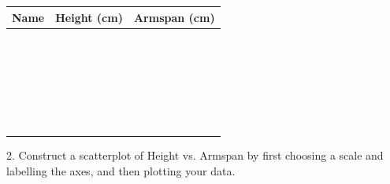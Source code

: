 \documentclass{article}
\begin{document}
\begin{center}
{\large
\begin{tabular}{c|c|c}
\textbf{Name} & \textbf{Height (cm)} & \textbf{Armspan (cm)} \\ \hline
 \hspace{4cm} & & \\ \hline
 & & \\ \hline
 & & \\ \hline
 & & \\ \hline
 & & \\ \hline
 & & \\ \hline
 & & \\ \hline
 & & \\ \hline
 & & \\ \hline
 & & \\ \hline
 & & \\ \hline
 & & \\ \hline
 & & \\ \hline
 & & \\ \hline
 & & \\ \hline
 & & \\ \hline
 & & \\ \hline
 & & \\ \hline
 & & \\ \hline
 & & \\ \hline
 & & \\ \hline
 & & \\ \hline
 & & \\ \hline
 & & \\ \hline
 & & \\ \hline
 & & \\
\end{tabular}
}
\end{center}

\pagebreak

{\huge 2. Construct a scatterplot of Height vs. Armspan by first choosing a scale and labelling the axes, and then  plotting your data.}

\vspace{0.4cm}
\end{document}
